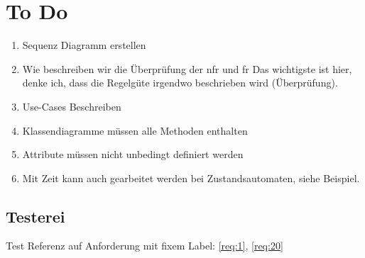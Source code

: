 \documentclass[Bachelorarbeit.tex]{subfiles}
\begin{document}
\chapter*{To Do}
%
\begin{enumerate}
	\item Sequenz Diagramm erstellen
	\item Wie beschreiben wir die Überprüfung der \acrshort{nfr} und \acrshort{fr} Das wichtigste ist hier, denke ich, dass die Regelgüte irgendwo beschrieben wird (Überprüfung).
	\item Use-Cases Beschreiben
	\item Klassendiagramme müssen alle Methoden enthalten
	\item Attribute müssen nicht unbedingt definiert werden
	\item Mit Zeit kann auch gearbeitet werden bei Zustandsautomaten, siehe Beispiel.
\end{enumerate}
%
\section*{Testerei}
%
Test Referenz auf Anforderung mit fixem Label: \ref{req:1}, \ref{req:20}\\
%
\end{document}
